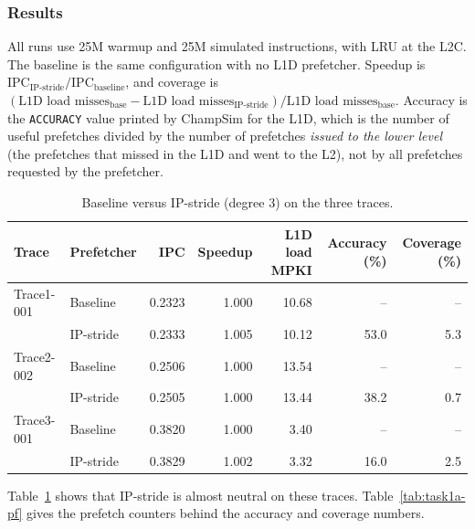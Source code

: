 \documentclass[11pt,a4paper]{article}
\begin{document}
\subsubsection{Results}

All runs use 25M warmup and 25M simulated instructions, with LRU at the L2C. The baseline is the
same configuration with no L1D prefetcher. Speedup is $\mathrm{IPC}_{\text{IP-stride}} /
\mathrm{IPC}_{\text{baseline}}$, and coverage is $(\text{L1D load misses}_{\text{base}} -
\text{L1D load misses}_{\text{IP-stride}}) / \text{L1D load misses}_{\text{base}}$. Accuracy is the
\texttt{ACCURACY} value printed by ChampSim for the L1D, which is the number of useful prefetches
divided by the number of prefetches \emph{issued to the lower level} (the prefetches that missed
in the L1D and went to the L2), not by all prefetches requested by the prefetcher.

\begin{table}[H]
    \centering
    \begin{tabular}{llrrrrr}
        \toprule
        Trace & Prefetcher & IPC & Speedup & L1D load MPKI & Accuracy (\%) & Coverage (\%) \\
        \midrule
        Trace1-001 & Baseline  & 0.2323 & 1.000 & 10.68 & --   & --  \\
                   & IP-stride & 0.2333 & 1.005 & 10.12 & 53.0 & 5.3 \\
        \midrule
        Trace2-002 & Baseline  & 0.2506 & 1.000 & 13.54 & --   & --  \\
                   & IP-stride & 0.2505 & 1.000 & 13.44 & 38.2 & 0.7 \\
        \midrule
        Trace3-001 & Baseline  & 0.3820 & 1.000 & 3.40  & --   & --  \\
                   & IP-stride & 0.3829 & 1.002 & 3.32  & 16.0 & 2.5 \\
        \bottomrule
    \end{tabular}
    \caption{Baseline versus IP-stride (degree 3) on the three traces.}
    \label{tab:task1a-main}
\end{table}

Table~\ref{tab:task1a-main} shows that IP-stride is almost neutral on these traces. Table~\ref{tab:task1a-pf}
gives the prefetch counters behind the accuracy and coverage numbers.
\end{document}
